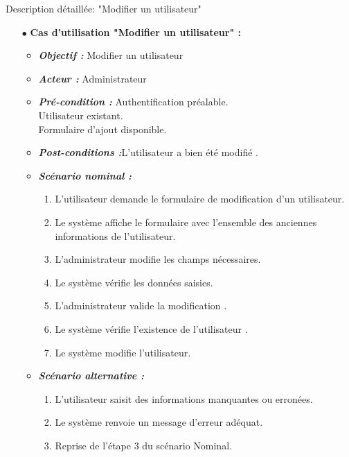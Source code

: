 {\Large \color{cyan} Description détaillée: "Modifier un utilisateur"}
\begin{itemize}
	\item[$\bullet$] \textbf{Cas d’utilisation "Modifier un utilisateur" :} 
	\medskip
	\begin{itemize}
		\item \textit{\textbf{Objectif :}} Modifier un utilisateur 	
		\item \textit{\textbf{Acteur :}} Administrateur	
		\item \textit{\textbf{Pré-condition  :}} Authentification préalable.\\
		Utilisateur existant.\\
		Formulaire d’ajout disponible.
\\
		\item \textit{\textbf{Post-conditions   :}}L’utilisateur a bien été modifié .
		\item \textit{\textbf{Scénario nominal :}}
		\begin{enumerate}
			\item L’utilisateur demande le formulaire de modification d’un utilisateur.
			\item Le système affiche le formulaire avec l’ensemble des anciennes informations de l’utilisateur.
			\item L’administrateur modifie les champs nécessaires. 
			\item Le système vérifie les données saisies. 
			\item L’administrateur valide la modification . 
			\item Le système vérifie l’existence de l’utilisateur .  
			\item Le système modifie l’utilisateur.
		\end{enumerate}
		\item \textit{\textbf{Scénario alternative :}}
		\begin{enumerate}
			\item L’utilisateur saisit des informations manquantes ou erronées.
			\item  Le système renvoie un message d’erreur adéquat.
			\item Reprise de l’étape 3 du scénario Nominal.
		\end{enumerate}
	\end{itemize}
\end{itemize}	

